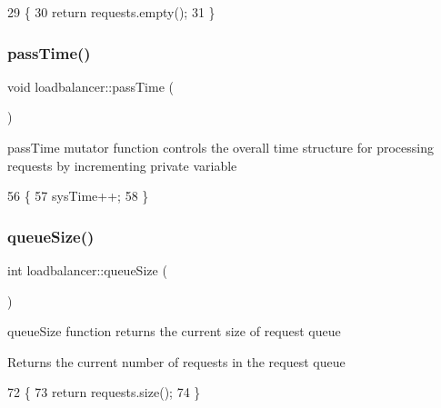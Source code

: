 \begin{DoxyCode}
29                            \{
30     \textcolor{keywordflow}{return} requests.empty();
31 \}
\end{DoxyCode}
\mbox{\label{classloadbalancer_a4d793bdf97c72b577ada58a774c3bddb}} 
\subsubsection{\texorpdfstring{pass\+Time()}{passTime()}}
{\footnotesize\ttfamily void loadbalancer\+::pass\+Time (\begin{DoxyParamCaption}{ }\end{DoxyParamCaption})}

pass\+Time mutator function controls the overall time structure for processing requests by incrementing private variable 
\begin{DoxyCode}
56                             \{
57     sysTime++;
58 \}
\end{DoxyCode}
\mbox{\label{classloadbalancer_a9716bb001708f3c7792df0d1c8689ab0}} 
\subsubsection{\texorpdfstring{queue\+Size()}{queueSize()}}
{\footnotesize\ttfamily int loadbalancer\+::queue\+Size (\begin{DoxyParamCaption}{ }\end{DoxyParamCaption})}

queue\+Size function returns the current size of request queue \begin{DoxyReturn}{Returns}
the current number of requests in the request queue 
\end{DoxyReturn}

\begin{DoxyCode}
72                             \{
73     \textcolor{keywordflow}{return} requests.size();
74 \}
\end{DoxyCode}
\mbox{\label{classloadbalancer_abaa9c95170cbf3c1c3041b17d31df4c0}} 
